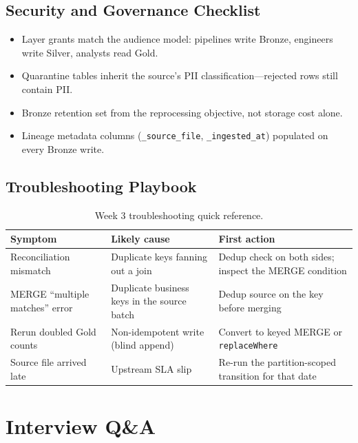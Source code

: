 \subsection{Security and Governance Checklist}
\begin{itemize}
    \item Layer grants match the audience model: pipelines write Bronze, engineers write Silver, analysts read Gold.
    \item Quarantine tables inherit the source's PII classification---rejected rows still contain PII.
    \item Bronze retention set from the reprocessing objective, not storage cost alone.
    \item Lineage metadata columns (\texttt{\_source\_file}, \texttt{\_ingested\_at}) populated on every Bronze write.
\end{itemize}

\subsection{Troubleshooting Playbook}
\begin{table}[H]
\centering
\small
\begin{tabular}{@{}p{3.6cm}p{4.2cm}p{4.8cm}@{}}
\toprule
\textbf{Symptom} & \textbf{Likely cause} & \textbf{First action} \\
\midrule
Reconciliation mismatch & Duplicate keys fanning out a join & Dedup check on both sides; inspect the MERGE condition \\
MERGE ``multiple matches'' error & Duplicate business keys in the source batch & Dedup source on the key before merging \\
Rerun doubled Gold counts & Non-idempotent write (blind append) & Convert to keyed MERGE or \texttt{replaceWhere} \\
Source file arrived late & Upstream SLA slip & Re-run the partition-scoped transition for that date \\
\bottomrule
\end{tabular}
\caption{Week 3 troubleshooting quick reference.}
\label{tab:ch3-trouble}
\end{table}

\section{Interview Q\&A}
